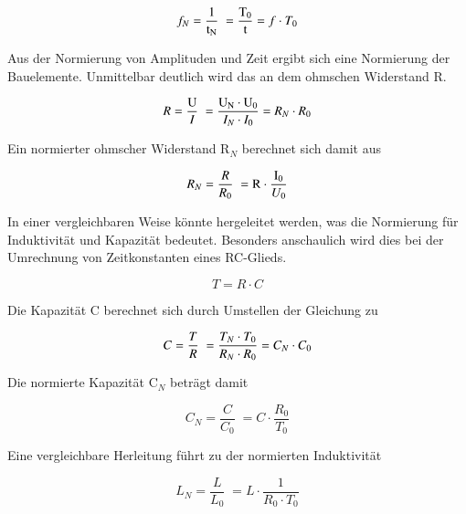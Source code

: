 \begin{equation}\label{eq:onehundredone}
f_{N} =\dfrac{{\rm 1}}{{\rm t}_{{\rm N}} } {\rm \; }=\dfrac{{\rm T}_{{\rm 0}} }{{\rm t}} =f\cdot T_{0}
\end{equation}


\noindent Aus der Normierung von Amplituden und Zeit ergibt sich eine Normierung der Bauelemente. Unmittelbar deutlich wird das an dem ohmschen Widerstand R.

\begin{equation}\label{eq:onehundredtwo}
R=\dfrac{{\rm U}}{I} {\rm \; }=\dfrac{{\rm U}_{{\rm N}} \cdot {\rm U}_{{\rm 0}} }{I_{N} \cdot I_{0} } =R_{N} \cdot R_{0}
\end{equation}


\noindent Ein normierter ohmscher Widerstand R${}_{N}$ berechnet sich damit aus 

\begin{equation}\label{eq:onehundredthree}
R_{N} =\dfrac{R}{R_{0} } {\rm \; }={\rm R}\cdot \dfrac{{\rm I}_{{\rm 0}} }{U_{0} }
\end{equation}


\noindent In einer vergleichbaren Weise k\"{o}nnte hergeleitet werden, was die Normierung f\"{u}r Induktivit\"{a}t und Kapazit\"{a}t bedeutet. Besonders anschaulich wird dies bei der Umrechnung von Zeitkonstanten eines RC-Glieds.

\begin{equation}\label{eq:onehundredfour}
T=R\cdot C
\end{equation}


\noindent Die Kapazit\"{a}t C berechnet sich durch Umstellen der Gleichung zu 

\begin{equation}\label{eq:onehundredfive}
C=\dfrac{T}{R} {\rm \; }=\dfrac{T_{N} \cdot T_{0} }{R_{N} \cdot R_{0} } =C_{N} \cdot C_{0}
\end{equation}

\noindent Die normierte Kapazit\"{a}t C${}_{N}$ betr\"{a}gt damit

\begin{equation}\label{eq:onehundredsix}
C_{N} =\dfrac{C}{C_{0} } \; =C\cdot \dfrac{R_{0} }{T_{0} }
\end{equation}

\noindent Eine vergleichbare Herleitung f\"{u}hrt zu der normierten Induktivit\"{a}t 

\begin{equation}\label{eq:onehundredseven}
L_{N} =\dfrac{L}{L_{0} } \; =L\cdot \dfrac{1}{R_{0} \cdot T_{0} } 
\end{equation}

